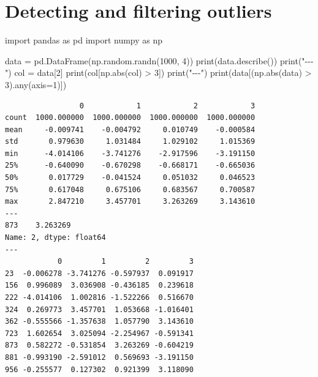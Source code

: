 \documentclass[
  english,
  letterpaper,
  DIV=11,
  numbers=noendperiod]{scrreprt}
\newenvironment{Shaded}{\begin{snugshade}}{\end{snugshade}}
\newcommand{\BuiltInTok}[1]{\textcolor[rgb]{0.00,0.23,0.31}{#1}}
\newcommand{\DecValTok}[1]{\textcolor[rgb]{0.68,0.00,0.00}{#1}}
\newcommand{\ImportTok}[1]{\textcolor[rgb]{0.00,0.46,0.62}{#1}}
\newcommand{\NormalTok}[1]{\textcolor[rgb]{0.00,0.23,0.31}{#1}}
\newcommand{\OperatorTok}[1]{\textcolor[rgb]{0.37,0.37,0.37}{#1}}
\newcommand{\StringTok}[1]{\textcolor[rgb]{0.13,0.47,0.30}{#1}}
\begin{document}
\section{Detecting and filtering
outliers}\label{detecting-and-filtering-outliers}

\begin{Shaded}
\begin{Highlighting}[]
\ImportTok{import}\NormalTok{ pandas }\ImportTok{as}\NormalTok{ pd}
\ImportTok{import}\NormalTok{ numpy }\ImportTok{as}\NormalTok{ np}

\NormalTok{data }\OperatorTok{=}\NormalTok{ pd.DataFrame(np.random.randn(}\DecValTok{1000}\NormalTok{, }\DecValTok{4}\NormalTok{))}
\BuiltInTok{print}\NormalTok{(data.describe())}
\BuiltInTok{print}\NormalTok{(}\StringTok{"{-}{-}{-}"}\NormalTok{)}
\NormalTok{col }\OperatorTok{=}\NormalTok{ data[}\DecValTok{2}\NormalTok{]}
\BuiltInTok{print}\NormalTok{(col[np.}\BuiltInTok{abs}\NormalTok{(col) }\OperatorTok{\textgreater{}} \DecValTok{3}\NormalTok{])}
\BuiltInTok{print}\NormalTok{(}\StringTok{"{-}{-}{-}"}\NormalTok{)}
\BuiltInTok{print}\NormalTok{(data[(np.}\BuiltInTok{abs}\NormalTok{(data) }\OperatorTok{\textgreater{}} \DecValTok{3}\NormalTok{).}\BuiltInTok{any}\NormalTok{(axis}\OperatorTok{=}\DecValTok{1}\NormalTok{)])}
\end{Highlighting}
\end{Shaded}

\begin{verbatim}
                 0            1            2            3
count  1000.000000  1000.000000  1000.000000  1000.000000
mean     -0.009741    -0.004792     0.010749    -0.000584
std       0.979630     1.031484     1.029102     1.015369
min      -4.014106    -3.741276    -2.917596    -3.191150
25%      -0.640090    -0.670298    -0.668171    -0.665036
50%       0.017729    -0.041524     0.051032     0.046523
75%       0.617048     0.675106     0.683567     0.700587
max       2.847210     3.457701     3.263269     3.143610
---
873    3.263269
Name: 2, dtype: float64
---
            0         1         2         3
23  -0.006278 -3.741276 -0.597937  0.091917
156  0.996089  3.036908 -0.436185  0.239618
222 -4.014106  1.002816 -1.522266  0.516670
324  0.269773  3.457701  1.053668 -1.016401
362 -0.555566 -1.357638  1.057790  3.143610
723  1.602654  3.025094 -2.254967 -0.591341
873  0.582272 -0.531854  3.263269 -0.604219
881 -0.993190 -2.591012  0.569693 -3.191150
956 -0.255577  0.127302  0.921399  3.118090
\end{verbatim}
\end{document}
